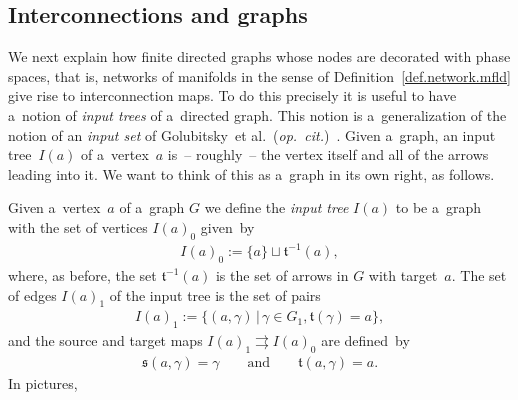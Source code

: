 \documentclass[pdftex]{sigma}
\numberwithin{equation}{section}
\begin{document}
\subsection{Interconnections and graphs}

We next explain how f\/inite directed graphs whose nodes are decorated with phase spaces, that is, networks of manifolds
in the sense of Def\/inition~\ref{def.network.mfld} give rise to interconnection maps.
To do this precisely it is useful to have a~notion of {\em input trees} of a~directed graph.
This notion is a~generalization of the notion of an {\em input set} of Golubitsky~et al.\ ({\em op.\ cit.})~\cite{Golubitsky.Stewart.Torok.05,Stewart.Golubitsky.Pivato.03}.
Given a~graph, an input tree~$I(a)$ of a~vertex~$a$ is~-- roughly~-- the vertex itself and all of the arrows leading into it.
We want to think of this as a~graph in its own right, as follows.

\begin{Definition}\label{def:input-tree}
Given a~vertex~$a$ of a~graph $ G$ we def\/ine the {\em input tree} $I(a)$ to be a~graph with the set of vertices $I(a)_0$
given~by
\begin{gather*}
I(a)_0:= \{a\}\sqcup \mathfrak t^{-1} (a),
\end{gather*}
where, as before, the set $\mathfrak t^{-1} (a)$ is the set of arrows in $ G$ with target~$a$.
The set of edges $I(a)_1$ of the input tree is the set of pairs
\begin{gather*}
I(a)_1:= \{(a, \gamma)\,|\, \gamma \in G_1, \mathfrak t(\gamma) =a \},
\end{gather*}
and the source and target maps $I(a)_1\rightrightarrows I(a)_0$ are def\/ined~by
\begin{gather*}
\mathfrak s(a, \gamma) = \gamma
\qquad
\text{and}
\qquad
\mathfrak t(a, \gamma) = a.
\end{gather*}
In pictures,

\end{Definition}
\end{document}
